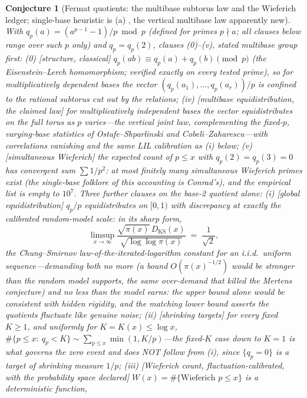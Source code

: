 \documentclass[11pt]{article}
\newtheorem{conjecture}{Conjecture}
\theoremstyle{definition}
\begin{document}
\setcounter{conjecture}{6}%
\begin{conjecture}[Fermat quotients: the multibase subtorus law and
the Wieferich ledger; single-base heuristic is (a) \cite{CDP}, the
vertical multibase law apparently new]\label{c23}
With $q_p(a)=(a^{p-1}-1)/p\bmod p$ (defined for primes $p\nmid a$;
all clauses below range over such $p$ only) and $q_p=q_p(2)$, clauses \emph{(0)}--\emph{(v)}, stated multibase group first:
\emph{(0)} [structure, classical] $q_p(ab)\equiv q_p(a)+q_p(b)
\pmod p$ (the Eisenstein--Lerch homomorphism; verified exactly on
every tested prime), so for multiplicatively \emph{dependent} bases
the vector $(q_p(a_1),\dots,q_p(a_r))/p$ is confined to the rational
subtorus cut out by the relations;
\emph{(iv)} [multibase equidistribution, the claimed law] for
multiplicatively \emph{independent} bases the vector equidistributes
on the full torus as $p$ varies---the \emph{vertical} joint law,
complementing the fixed-$p$, varying-base statistics of
Ostafe--Shparlinski and Cobeli--Zaharescu---with correlations
vanishing and the same LIL calibration as (i) below;
\emph{(v)} [simultaneous Wieferich] the expected count of $p\le x$
with $q_p(2)=q_p(3)=0$ has convergent sum $\sum1/p^2$: at most
finitely many simultaneous Wieferich primes exist (the single-base
folklore of this accounting is Conrad's), and the empirical list is
empty to $10^7$.  Three further clauses on the base-2 quotient
alone:
\emph{(i)} [global equidistribution] $q_p/p$ equidistributes on
$[0,1)$ with discrepancy at exactly the calibrated random-model
scale: in its sharp form,
\[
\limsup_{x\to\infty}
\frac{\sqrt{\pi(x)}\,D_{\mathrm{KS}}(x)}
{\sqrt{\log\log\pi(x)}}
\;=\;\frac1{\sqrt2},
\]
the Chung--Smirnov law-of-the-iterated-logarithm constant for an
i.i.d.\ uniform sequence---demanding both no more (a bound
$O(\pi(x)^{-1/2})$ would be \emph{stronger than the random model
supports}, the same over-demand that killed the Mertens conjecture)
and no less than the model earns: the upper bound alone would be consistent
with
hidden rigidity, and the matching lower bound asserts the quotients
fluctuate like genuine noise;
\emph{(ii)} [shrinking targets] for every fixed $K\ge1$, and uniformly
for $K=K(x)\le\log x$,
$\#\{p\le x:\ q_p<K\}\sim\sum_{p\le x}\min(1,K/p)$---the fixed-$K$
case down to $K=1$ is what governs the zero event and does NOT follow
from (i), since $\{q_p=0\}$ is a target of shrinking measure $1/p$;
\emph{(iii)} [Wieferich count, fluctuation-calibrated, with the
probability space declared]
$W(x)=\#\{\text{Wieferich } p\le x\}$ is a deterministic function,

\end{conjecture}
\end{document}
